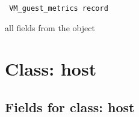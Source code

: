 \vspace{0.3cm}

{\tt 
VM\_guest\_metrics record
}


all fields from the object
\vspace{0.3cm}
\vspace{0.3cm}
\vspace{0.3cm}

\vspace{1cm}
\newpage
\section{Class: host}
\subsection{Fields for class: host}
